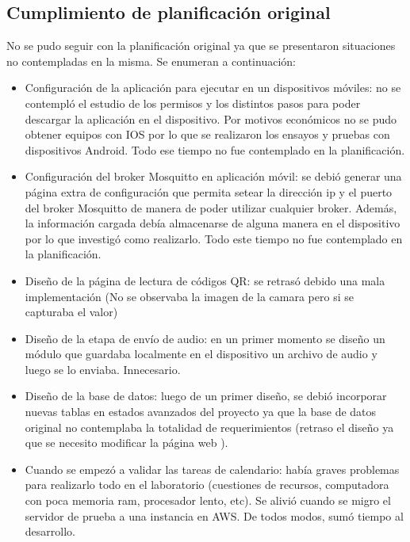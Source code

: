\subsection{Cumplimiento de planificación original}

No se pudo seguir con la planificación original ya que se presentaron situaciones no contempladas en la misma. Se enumeran a continuación:

\begin{itemize}

\item Configuración de la aplicación para ejecutar en un dispositivos móviles: no se contempló el estudio de los permisos y los distintos pasos para poder descargar la aplicación en el dispositivo. Por motivos económicos no se pudo obtener equipos con IOS  por lo que se realizaron los ensayos y pruebas con dispositivos Android. Todo ese tiempo no fue contemplado en la planificación.
\item Configuración del broker Mosquitto en aplicación móvil: se debió generar una página extra de configuración que permita setear la dirección ip y el puerto del broker Mosquitto de manera de poder utilizar cualquier broker. Además, la información cargada debía almacenarse de alguna manera en el dispositivo por lo que investigó como realizarlo. Todo este tiempo no fue contemplado en la planificación.
\item Diseño de la página de lectura de códigos QR: se retrasó debido una mala implementación (No se observaba la imagen de la camara pero si se capturaba el valor)
\item Diseño de la etapa de envío de audio: en un primer momento se diseño un módulo que guardaba localmente en el dispositivo un archivo de audio y luego se lo enviaba. Innecesario.
\item Diseño de la base de datos: luego de un primer diseño, se debió incorporar nuevas tablas en estados avanzados del proyecto ya que la base de datos original no contemplaba la totalidad de requerimientos (retraso el diseño ya que se necesito modificar la página web ).
\item Cuando se empezó a validar las tareas de calendario: había graves problemas para realizarlo todo en el laboratorio (cuestiones de recursos, computadora con poca memoria ram, procesador lento, etc). Se alivió cuando se migro el servidor de prueba a una instancia en AWS. De todos modos, sumó tiempo al desarrollo.


\end{itemize}

